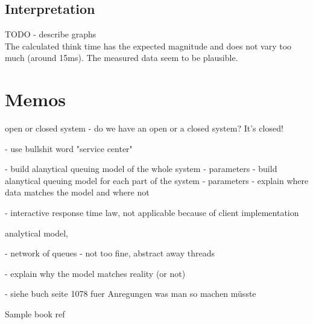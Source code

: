\documentclass[a4paper]{article}
\begin{document}
\subsection{Interpretation}

TODO - describe graphs\\

The calculated think time has the expected magnitude and does not vary too much (around 15ms). The measured data seem to be plausible.


\pagebreak

\section{Memos}

open or closed system
- do we have an open or a closed system? It's closed!

- use bullshit word "service center"

- build alanytical queuing model of the whole system
  - parameters
- build alanytical queuing model for each part of the system
  - parameters
- explain where data matches the model and where not

- interactive response time law, not applicable because of client implementation

analytical model, 


- network of queues
  - not too fine, abstract away threads
  
  
- explain why the model matches reality (or not)


- siehe buch seite 1078 fuer Anregungen was man so machen müsste

Sample book ref \cite[Page 556]{Raj}




\end{document}
